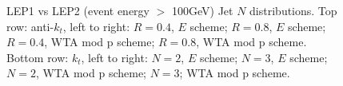 \begin{figure}[H]
\hfill
{}\hfill
{}\hfill
\caption{LEP1 vs LEP2 (event energy $>$ 100GeV) Jet $N$ distributions. Top row: anti-$k_t$, left to right: $R=0.4$, $E$ scheme; $R=0.8$, $E$ scheme; $R=0.4$, WTA mod p scheme; $R=0.8$, WTA mod p scheme. Bottom row: $k_t$, left to right: $N=2$, $E$ scheme; $N=3$, $E$ scheme; $N=2$, WTA mod p scheme; $N=3$; WTA mod p scheme.}  
\end{figure} 

